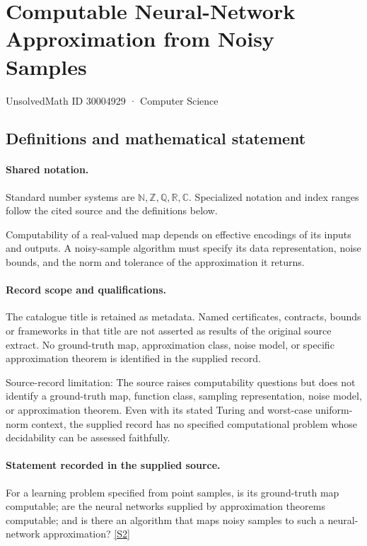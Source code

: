 \documentclass[11pt]{article}
\newcommand{\sref}[2]{\hyperlink{source:#1:#2}{[S#2]}}
\begin{document}
\setcounter{section}{30004928}
\section{Computable Neural-Network Approximation from Noisy Samples}\label{30004929}
{\small\sffamily UnsolvedMath ID 30004929 · Computer Science}
\subsection{Definitions and mathematical statement}

\paragraph{Shared notation.}Standard number systems are $\mathbb N,\mathbb Z,\mathbb Q,\mathbb R,\mathbb C$. Specialized notation and index ranges follow the cited source and the definitions below.


Computability of a real-valued map depends on effective encodings of its inputs and outputs. A noisy-sample algorithm must specify its data representation, noise bounds, and the norm and tolerance of the approximation it returns.
\paragraph{Record scope and qualifications.}
The catalogue title is retained as metadata. Named certificates, contracts, bounds or frameworks in that title are not asserted as results of the original source extract.
No ground-truth map, approximation class, noise model, or specific approximation theorem is identified in the supplied record.

Source-record limitation: The source raises computability questions but does not identify a ground-truth map, function class, sampling representation, noise model, or approximation theorem. Even with its stated Turing and worst-case uniform-norm context, the supplied record has no specified computational problem whose decidability can be assessed faithfully.
\paragraph{Statement recorded in the supplied source.}
For a learning problem specified from point samples, is its ground-truth map computable; are the neural networks supplied by approximation theorems computable; and is there an algorithm that maps noisy samples to such a neural-network approximation? \sref{30004929}{2}
\end{document}
